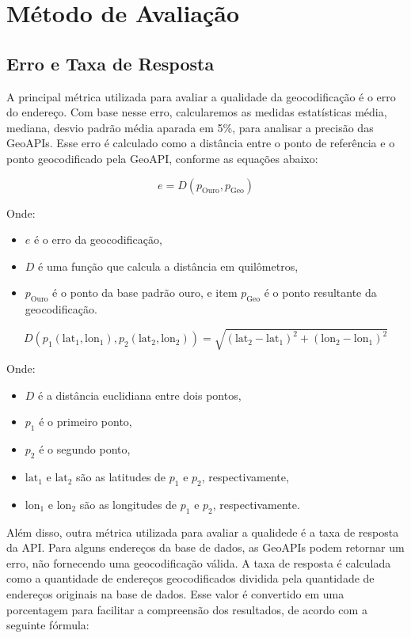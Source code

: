 \section{Método de Avaliação}
\label{metricasErro}

\subsection{Erro e Taxa de Resposta}

A principal métrica utilizada para avaliar a qualidade da geocodificação é o erro do endereço. Com base nesse erro, calcularemos as medidas estatísticas média, mediana, desvio padrão média aparada em 5\%, para analisar a precisão das GeoAPIs. Esse erro é calculado como a distância entre o ponto de referência e o ponto geocodificado pela GeoAPI, conforme as equações abaixo:

\begin{equation}
e = D(p_{\text{Ouro}}, p_{\text{Geo}})
\end{equation}

Onde:
\begin{itemize}
\item $e$ é o erro da geocodificação,
\item $D$ é uma função que calcula a distância em quilômetros,
\item $p_{\text{Ouro}}$ é o ponto da base padrão ouro, e
item $p_{\text{Geo}}$ é o ponto resultante da geocodificação.
\end{itemize}

\begin{equation}
D( p_1(\text{lat}_1, \text{lon}_1), p_2(\text{lat}_2, \text{lon}_2) ) = \sqrt{{(\text{lat}_2 - \text{lat}_1)^2 + (\text{lon}_2 - \text{lon}_1)^2}}
\label{eq:distEuclidian}
\end{equation}

Onde:
\begin{itemize}
    \item $D$ é a distância euclidiana entre dois pontos,
    \item $p_1$ é o primeiro ponto,
    \item $p_2$ é o segundo ponto,
    \item $\text{lat}_1$ e $\text{lat}_2$ são as latitudes de $p_1$ e $p_2$, respectivamente,
    \item $\text{lon}_1$ e $\text{lon}_2$ são as longitudes de $p_1$ e $p_2$, respectivamente.
\end{itemize}

Além disso, outra métrica utilizada para avaliar a qualidede é a taxa de resposta da API. Para alguns endereços da base de dados, as GeoAPIs podem retornar um erro, não fornecendo uma geocodificação válida. A taxa de resposta é calculada como a quantidade de endereços geocodificados dividida pela quantidade de endereços originais na base de dados. Esse valor é convertido em uma porcentagem para facilitar a compreensão dos resultados, de acordo com a seguinte fórmula:

